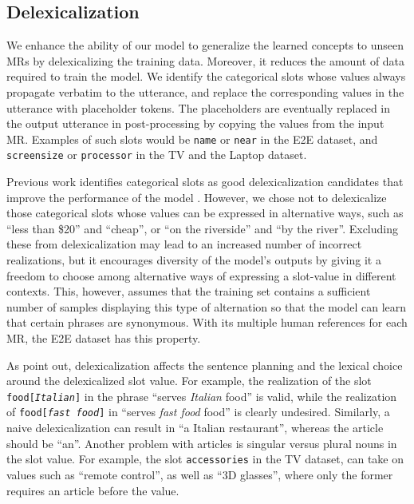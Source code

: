\documentclass[11pt,a4paper]{article}
\begin{document}
\subsection{Delexicalization}
\label{subsec:delex}

We enhance the ability of our model to generalize the learned concepts to unseen MRs by delexicalizing the training data. Moreover, it reduces the amount of data required to train the model. We identify the categorical slots whose values always propagate verbatim to the utterance, and replace the corresponding values in the utterance with placeholder tokens. The placeholders are eventually replaced in the output utterance in post-processing  by copying the  values from the input MR. Examples of such slots would be \texttt{name} or \texttt{near} in the E2E dataset, and \texttt{screensize} or \texttt{processor} in the TV and the Laptop dataset.

Previous work identifies categorical slots as good delexicalization candidates that improve  the performance of the model \cite{wen2015semantically,nayak2017plan}. However, we chose not to delexicalize those categorical slots whose values can be expressed in alternative ways, such as ``less than \$20'' and ``cheap'',  or ``on the riverside'' and ``by the river''. Excluding these from delexicalization may lead to an increased number of incorrect realizations, but it encourages diversity of the model's outputs by giving it a freedom to choose among alternative ways of expressing a slot-value in different contexts. This, however, assumes that the training set contains a sufficient number of samples displaying this type of alternation so that the model can learn that certain phrases are synonymous. With its multiple human references for each MR, the E2E dataset has this property.

As \citet{nayak2017plan} point out, delexicalization affects the sentence planning and the lexical choice around the delexicalized slot value. For example, the realization of the slot \texttt{food[\emph{Italian}]} in the phrase ``serves \emph{Italian} food'' is valid, while the realization of \texttt{food[\emph{fast food}]} in ``serves \emph{fast food} food'' is clearly undesired. Similarly, a naive delexicalization can result in ``a Italian restaurant'', whereas the article should be ``an''.  Another problem with articles is singular versus plural nouns in the slot value. For example, the slot \texttt{accessories} in the TV dataset, can take on values such as ``remote control'', as well as ``3D glasses'', where only the former  requires an article before the value.
\end{document}
